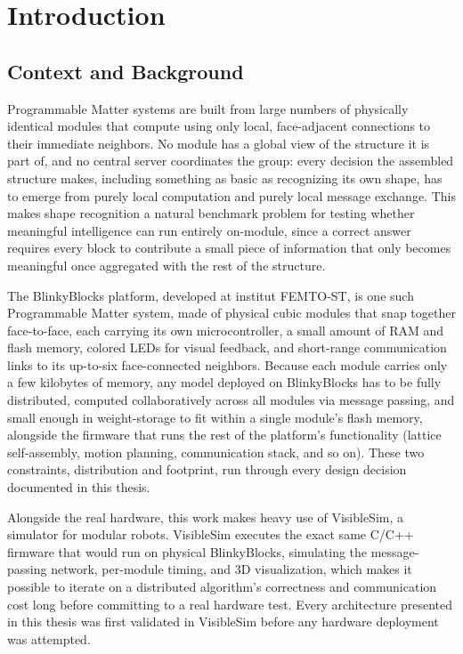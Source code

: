\documentclass[12pt,a4paper]{report}
\begin{document}
\clearpage
\tableofcontents
\clearpage
\listoffigures
\clearpage
\listoftables

\clearpage
{}
\setcounter{page}{1}

\chapter{Introduction}

\section{Context and Background}

Programmable Matter systems are built from large numbers of physically identical modules that compute using only local, face-adjacent connections to their immediate neighbors. No module has a global view of the structure it is part of, and no central server coordinates the group: every decision the assembled structure makes, including something as basic as recognizing its own shape, has to emerge from purely local computation and purely local message exchange. This makes shape recognition a natural benchmark problem for testing whether meaningful intelligence can run entirely on-module, since a correct answer requires every block to contribute a small piece of information that only becomes meaningful once aggregated with the rest of the structure.

The BlinkyBlocks platform, developed at institut FEMTO-ST, is one such Programmable Matter system, made of physical cubic modules that snap together face-to-face, each carrying its own microcontroller, a small amount of RAM and flash memory, colored LEDs for visual feedback, and short-range communication links to its up-to-six face-connected neighbors. Because each module carries only a few kilobytes of memory, any model deployed on BlinkyBlocks has to be fully distributed, computed collaboratively across all modules via message passing, and small enough in weight-storage to fit within a single module's flash memory, alongside the firmware that runs the rest of the platform's functionality (lattice self-assembly, motion planning, communication stack, and so on). These two constraints, distribution and footprint, run through every design decision documented in this thesis.

Alongside the real hardware, this work makes heavy use of VisibleSim, a simulator for modular robots. VisibleSim executes the exact same C/C++ firmware that would run on physical BlinkyBlocks, simulating the message-passing network, per-module timing, and 3D visualization, which makes it possible to iterate on a distributed algorithm's correctness and communication cost long before committing to a real hardware test. Every architecture presented in this thesis was first validated in VisibleSim before any hardware deployment was attempted.
\end{document}
